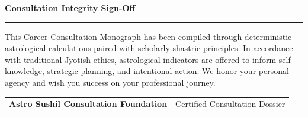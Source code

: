 \documentclass[10pt,oneside]{article}
\newcommand{\CardTitle}[1]{%
  {\sffamily\fontsize{9}{11}\selectfont\bfseries\color{DeepSlate}#1}\par
  \vspace{1mm}%
  {\textcolor{AccentGold}{\rule{18mm}{0.6pt}}}\par
  \vspace{2mm}%
}
\begin{document}
\vspace{4mm}
\begin{highlightcard}
  \CardTitle{Consultation Integrity Sign-Off}
  {\fontsize{8.5}{12}\selectfont\color{DeepSlate}
  This Career Consultation Monograph has been compiled through deterministic astrological calculations paired with scholarly shastric principles. In accordance with traditional Jyotish ethics, astrological indicators are offered to inform self-knowledge, strategic planning, and intentional action. We honor your personal agency and wish you success on your professional journey.\par}
  \vspace{3mm}
  \begin{tabularx}{\linewidth}{@{}X r@{}}
    {\sffamily\fontsize{8}{10}\selectfont\bfseries\color{ExecutiveNavy} Astro Sushil Consultation Foundation} & {\sffamily\fontsize{8}{10}\selectfont\color{MutedSlate} Certified Consultation Dossier} \\
  \end{tabularx}
\end{highlightcard}
\end{document}

